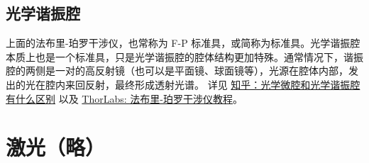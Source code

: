 \documentclass[UTF8]{report}
\theoremstyle{MyLineTheoremStyle} %
\theoremstyle{MyBlockTheoremStyle} %
\theoremstyle{MySubsubsectionStyle} %
\begin{document}

\subsection{光学谐振腔}

上面的法布里-珀罗干涉仪，也常称为 F-P 标准具，或简称为标准具。光学谐振腔本质上也是一个标准具，只是光学谐振腔的腔体结构更加特殊。通常情况下，谐振腔的两侧是一对的高反射镜（也可以是平面镜、球面镜等），光源在腔体内部，发出的光在腔内来回反射，最终形成透射光谱。
详见 \href{https://www.zhihu.com/question/476559619/answer/3015092750}{知乎：光学微腔和光学谐振腔有什么区别} 以及 \href{https://www.thorlabs.com/newgrouppage9.cfm?objectgroup\_id=9021}{ThorLabs: 法布里-珀罗干涉仪教程}。

\section{激光（略）}
\end{document}
